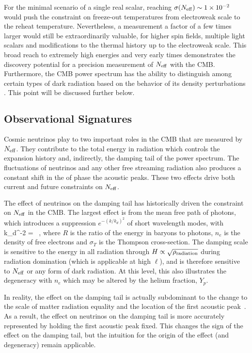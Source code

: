 For the minimal scenario of a single real scalar, reaching $\sigma(N_{\rm eff}) \sim 1\times 10^{-2}$ would push the constraint on freeze-out temperatures from electroweak scale to the reheat temperature.  Nevertheless, a measurement a factor of a few times larger would still be extraordinarily valuable, for higher spin fields, multiple light scalars and modifications to the thermal history up to the electroweak scale.  This broad reach to extremely high energies and very early times demonstrates the discovery potential for a precision measurement of $N_{\rm eff}$ with the CMB.  Furthermore, the CMB power spectrum has the ability to distinguish among certain types of dark radiation based on the behavior of its density perturbations  \cite{Chacko:2015noa,Baumann:2015rya}.  This point will be discussed further below.




\subsection{Observational Signatures}

Cosmic neutrinos play to two important roles in the CMB that are measured by $N_{\rm eff}$.  They contribute to the total energy in radiation which controls the expansion history and, indirectly, the damping tail of the power spectrum.  The fluctuations of neutrinos and any other free streaming radiation also produces a constant shift in the of phase the acoustic peaks.  These two effects drive both current and future constraints on $N_{\rm eff}$.  

The effect of neutrinos on the damping tail has historically driven the constraint on $N_{\rm eff}$ in the CMB.  The largest effect is from the mean free path of photons, which introduces a suppression $e^{-(k/k_d)^2}$ of short wavelength modes, with~\cite{Zaldarriaga:1995gi}
\beq
k_d^{-2} =\int {}  \ ,
\eeq
where $R$ is the ratio of the energy in baryons to photons, $n_e$ is the density of free electrons and $\sigma_T$ is the Thompson cross-section.  The damping scale is sensitive to the energy in all radiation through $H \propto \sqrt{\rho_{\rm radiation}}$ during radiation domination (which is applicable at high $\ell$), and is therefore sensitive to $N_{\rm eff}$ or any form of dark radiation.  At this level, this also illustrates the degeneracy with $n_e$ which may be altered by the helium fraction, $Y_p$.

In reality, the effect on the damping tail is actually subdominant to the change to the scale of matter radiation equality and the location of the first acoustic peak~\cite{Hou:2011ec}.  As a result, the effect on neutrinos on the damping tail is more accurately represented by holding the first acoustic peak fixed.  This changes the sign of the effect on the damping tail, but the intuition for the origin of the effect (and degeneracy) remain applicable.

